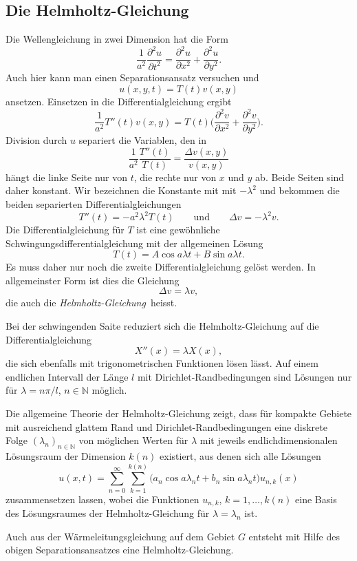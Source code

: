 \subsection{Die Helmholtz-Gleichung}
Die Wellengleichung in zwei Dimension hat die Form
\[
\frac{1}{a^2}
\frac{\partial^2u}{\partial t^2}
=
\frac{\partial^2 u}{\partial x^2}
+
\frac{\partial^2 u}{\partial y^2}.
\]
Auch hier kann man einen Separationsansatz versuchen und
\[
u(x,y,t) = T(t) v(x,y)
\]
ansetzen.
Einsetzen in die Differentialgleichung ergibt
\[
\frac{1}{a^2}
T''(t) v(x,y)
=
T(t)
\biggl(
\frac{\partial^2 v}{\partial x^2}
+
\frac{\partial^2 v}{\partial y^2}
\biggr).
\]
Division durch $u$ separiert die Variablen, den in
\[
\frac{1}{a^2}
\frac{T''(t)}{T(t)}
=
\frac{\Delta v(x,y)}{v(x,y)}
\]
hängt die linke Seite nur von $t$, die rechte nur von $x$ und $y$ ab.
Beide Seiten sind daher konstant.
Wir bezeichnen die Konstante mit mit $-\lambda^2$ und bekommen die
beiden separierten Differentialgleichungen
\[
T''(t) = -a^2\lambda^2 T(t)
\qquad\text{und}\qquad
\Delta v = -\lambda^2 v.
\]
Die Differentialgleichung für $T$ ist eine gewöhnliche
Schwingungsdifferentialgleichung mit der allgemeinen Lösung
\[
T(t) = A\cos a\lambda t + B \sin a\lambda t.
\]
Es muss daher nur noch die zweite Differentialgleichung gelöst
werden.
In allgemeinster Form ist dies die Gleichung
\begin{equation}
\Delta v = \lambda v,
\end{equation}
die auch die {\em Helmholtz-Gleichung} heisst.
%


Bei der schwingenden Saite reduziert sich die Helmholtz-Gleichung
auf die Differentialgleichung
\[
X''(x) = \lambda X(x),
\]
die sich ebenfalls mit trigonometrischen Funktionen lösen lässt.
Auf einem endlichen Intervall der Länge $l$ mit Dirichlet-Randbedingungen
sind Lösungen nur für $\lambda=n\pi/l$, $n\in\mathbb{N}$ möglich.

Die allgemeine Theorie der Helmholtz-Gleichung zeigt, dass für
kompakte Gebiete mit ausreichend glattem Rand und Dirichlet-Randbedingungen
eine diskrete Folge $(\lambda_n)_{n\in\mathbb{N}}$ von möglichen Werten
für $\lambda$ mit jeweils endlichdimensionalen Lösungsraum der Dimension
$k(n)$ existiert, aus denen sich alle Lösungen
\[
u(x,t)
=
\sum_{n=0}^\infty
\sum_{k=1}^{k(n)}
\bigl(
a_n
\cos a\lambda_n t
+
b_n
\sin a\lambda_n t
\bigr)
u_{n,k}(x)
\]
zusammensetzen lassen, wobei die Funktionen $u_{n,k}$, $k=1,\dots,k(n)$
eine Basis des Lösungsraumes der Helmholtz-Gleichung für $\lambda=\lambda_n$
ist.

Auch aus der Wärmeleitungsgleichung auf dem Gebiet $G$ entsteht
mit Hilfe des obigen Separationsansatzes eine Helmholtz-Gleichung.

